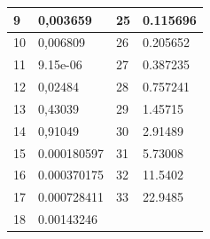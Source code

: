 \documentclass[11pt,openany]{book}
\begin{document}
\begin{figure}[H]
\begin{minipage}{0.5\textwidth}
\begin{tabular}{|l|l|l|l|}
            9 & 0,003659 & 25 & 0.115696 \\ \hline
            10 & 0,006809 & 26 & 0.205652 \\ \hline
            11 & 9.15e-06 & 27 & 0.387235 \\ \hline
            12 & 0,02484 & 28 & 0.757241 \\ \hline
            13 & 0,43039 & 29 & 1.45715 \\ \hline
            14 & 0,91049 & 30 & 2.91489 \\ \hline
            15 & 0.000180597 & 31 & 5.73008 \\ \hline
            16 & 0.000370175 & 32 & 11.5402 \\ \hline
            17 & 0.000728411 & 33 & 22.9485 \\ \hline
            18 & 0.00143246 & ~ & \\ \hline
        \end{tabular}
    \end{minipage}
\end{figure}
\end{document}
